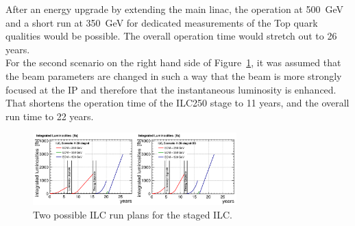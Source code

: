 After an energy upgrade by extending the main linac, the operation at \SI{500}{\GeV} and a short run at \SI{350}{\GeV} for dedicated measurements of the Top quark qualities would be possible.
The overall operation time would stretch out to 26 years.\\
For the second scenario on the right hand side of Figure~\ref{fig:ILC_runningtime}, it was assumed that the beam parameters are changed in such a way that the beam is more strongly focused at the IP and therefore that the instantaneous luminosity is enhanced.
That shortens the operation time of the ILC250 stage to 11 years, and the overall run time to 22 years.~\cite[p. 7]{PhysicsCase}
\begin{figure}[h]
\centering
\includegraphics[width=0.7\textwidth]{Figures/ILC_runningtime.png}
\caption[ILC run plan]{Two possible ILC run plans for the staged ILC.~\cite[p. 8]{PhysicsCase}}
\label{fig:ILC_runningtime}
\end{figure}


